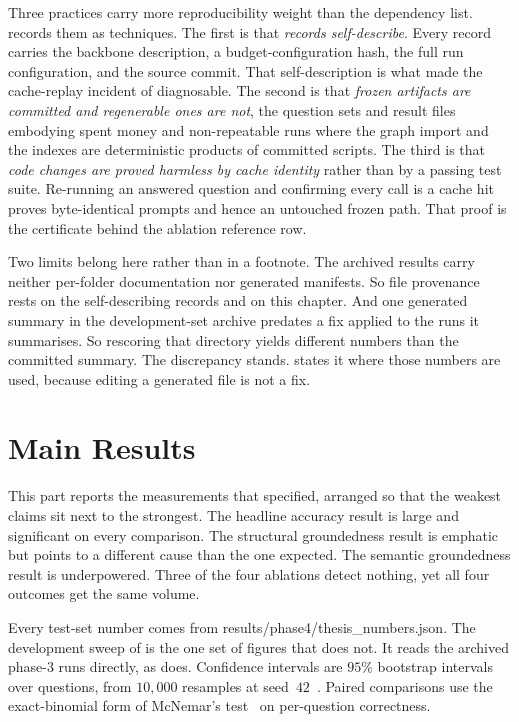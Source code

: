 Three practices carry more reproducibility weight than the dependency list.
 records them as techniques. The first is that
\emph{records self-describe}. Every record carries the backbone description, a
budget-configuration hash, the full run configuration, and the source commit.
That self-description is what made the cache-replay incident of
 diagnosable. The second is that \emph{frozen artifacts are
committed and regenerable ones are not}, the question sets and result files
embodying spent money and non-repeatable runs where the graph import and the
indexes are deterministic products of committed scripts. The third is that
\emph{code changes are proved harmless by cache identity} rather than by a
passing test suite. Re-running an answered question and confirming every call is
a cache hit proves byte-identical prompts and hence an untouched frozen path.
That proof is the certificate behind the ablation reference row.

Two limits belong here rather than in a footnote. The archived results carry
neither per-folder documentation nor generated manifests. So file provenance
rests on the self-describing records and on this chapter. And one generated
summary in the development-set archive predates a fix applied to the runs it
summarises. So rescoring that directory yields different numbers than the
committed summary. The discrepancy stands.  states it where
those numbers are used, because editing a generated file is not a fix.

\section{Main Results}\label{sec:results}

This part reports the measurements that  specified, arranged so
that the weakest claims sit next to the strongest. The headline accuracy result
is large and significant on every comparison. The structural groundedness result
is emphatic but points to a different cause than the one expected. The semantic
groundedness result is underpowered. Three of the four ablations detect nothing,
yet all four outcomes get the same volume.

Every test-set number comes from \textsf{results/phase4/thesis\_numbers.json}.
The development sweep of  is the one set of figures that
does not. It reads the archived phase-3 runs directly, as 
does. Confidence intervals are $95\%$ bootstrap intervals over questions, from
$10{,}000$ resamples at seed~$42$~\cite{efron1979bootstrap}. Paired comparisons
use the exact-binomial form of McNemar's test~\cite{mcnemar1947note} on
per-question correctness.


